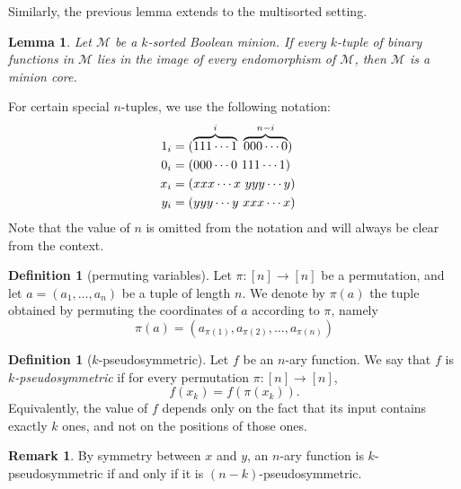 \documentclass{amsart}
\numberwithin{equation}{section}
\theoremstyle{plain}
\newtheorem{lemma}[theorem]{Lemma}
\theoremstyle{definition}
\newtheorem{definition}[theorem]{Definition}
\newtheorem{remark}[theorem]{Remark}
\def\minion#1{\mathcal{#1}}
\begin{document}
Similarly, the previous lemma extends to the multisorted setting.

\begin{lemma}
  \label{proof-minion}
  Let $\minion{M}$ be a $k$-sorted Boolean minion. If every $k$-tuple of binary functions in $\minion{M}$ lies in the image of every endomorphism of $\minion{M}$, then $\minion{M}$ is a minion core.
\end{lemma}


For certain special $n$-tuples, we use the following notation:
\begin{align*}
  1_i &= (\overbrace{111\cdots 1}^i\ \overbrace{000\cdots 0}^{n-i}) \cr
  0_i &= (000\cdots 0\ 111\cdots 1) \cr
  x_i &= (xxx\cdots x\ yyy\cdots y) \cr
  y_i &= (yyy\cdots y\ xxx\cdots x) 
\end{align*}
Note that the value of $n$ is omitted from the notation and will always be clear from the context.

\begin{definition}[permuting variables] Let $\pi\colon [n]\to [n]$ be a permutation, and let $a=(a_1,\dots,a_n)$ be a tuple of length $n$. We denote by $\pi(a)$
the tuple obtained by permuting the coordinates of $a$ according to $\pi$, namely
$$\pi(a) = (a_{\pi(1)},a_{\pi(2)},\dots,a_{\pi(n)})$$
\end{definition}

\begin{definition}[$k$-pseudosymmetric] 
Let $f$ be an $n$-ary function. We say that $f$ is {\em $k$-pseudosymmetric} if for every permutation $\pi:[n]\to[n]$,
$$f(x_k)=f(\pi(x_k)).$$
Equivalently, the value of $f$ depends only on the fact that its input contains exactly $k$ ones, and not on the positions of those ones.
\end{definition}


\begin{remark}
By symmetry between $x$ and $y$, an $n$-ary function is $k$-pseudosymmetric if and only if it is $(n-k)$-pseudosymmetric.
\end{remark}
\end{document}
